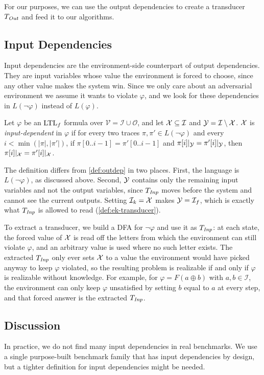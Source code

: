 For our purposes, we can use the output dependencies to create a transducer $T_{\mathit{Out}}$ and feed it to our algorithms.

\subsection{Input Dependencies}
Input dependencies are the environment-side counterpart of output dependencies.
They are input variables whose value the environment is forced to choose, since any other value makes the system win.
Since we only care about an adversarial environment we assume it wants to violate $\varphi$, and we look for these dependencies in $L(\lnot\varphi)$ instead of $L(\varphi)$.
\begin{definition}\label{def:indep}
Let $\varphi$ be an $\text{LTL}_f$ formula over $\mathcal{V} = \mathcal{I} \cup \mathcal{O}$, and let $\mathcal{X} \subseteq \mathcal{I}$ and $\mathcal{Y} = \mathcal{I} \setminus \mathcal{X}$.
$\mathcal{X}$ is \emph{input-dependent} in $\varphi$ if for every two traces $\pi, \pi' \in L(\lnot\varphi)$ and every $i < \min(|\pi|, |\pi'|)$, if $\pi[0..i-1] = \pi'[0..i-1]$ and $\pi[i]|_{\mathcal{Y}} = \pi'[i]|_{\mathcal{Y}}$, then $\pi[i]|_{\mathcal{X}} = \pi'[i]|_{\mathcal{X}}$.
\end{definition}

The definition differs from \cref{def:outdep} in two places.
First, the language is $L(\lnot\varphi)$, as discussed above.
Second, $\mathcal{Y}$ contains only the remaining input variables and not the output variables, since $T_{\mathit{Inp}}$ moves before the system and cannot see the current outputs.
Setting $\mathcal{I}_{k} = \mathcal{X}$ makes $\mathcal{Y} = \mathcal{I}_{f}$, which is exactly what $T_{\mathit{Inp}}$ is allowed to read (\cref{def:ek-transducer}).

To extract a transducer, we build a DFA for $\lnot\varphi$ and use it as $T_{\mathit{Inp}}$: at each state, the forced value of $\mathcal{X}$ is read off the letters from which the environment can still violate $\varphi$, and an arbitrary value is used where no such letter exists.
The extracted $T_{\mathit{Inp}}$ only ever sets $\mathcal{X}$ to a value the environment would have picked anyway to keep $\varphi$ violated, so the resulting problem is realizable if and only if $\varphi$ is realizable without knowledge.
For example, for $\varphi = F(a \oplus b)$ with $a, b \in \mathcal{I}$, the environment can only keep $\varphi$ unsatisfied by setting $b$ equal to $a$ at every step, and that forced answer is the extracted $T_{\mathit{Inp}}$.

\subsection{Discussion}

In practice, we do not find many input dependencies in real benchmarks.
We use a single purpose-built benchmark family that has input dependencies by design, but a tighter definition for input dependencies might be needed.